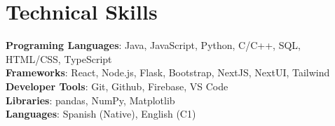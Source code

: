 \documentclass[letterpaper,11pt]{article}
\begin{document}
%
\section{Technical Skills}
\begin{itemize}[leftmargin=0.15in, label={}]
	\small{\item{
		            \textbf{Programing Languages}{: Java, JavaScript, Python, C/C++, SQL, HTML/CSS, TypeScript} \\
		            \textbf{Frameworks}{: React, Node.js, Flask, Bootstrap, NextJS, NextUI, Tailwind} \\
		            \textbf{Developer Tools}{: Git, Github, Firebase, VS Code} \\
		            \textbf{Libraries}{: pandas, NumPy, Matplotlib} \\
		            \textbf{Languages}{: Spanish (Native), English (C1)} \\
		      }}
\end{itemize}


\end{document}
